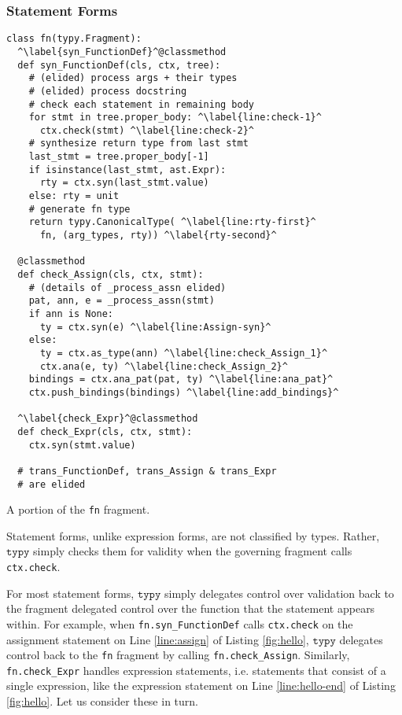 \documentclass[preprint,10pt]{sigplanconf}
\newcommand{\typy}{\texttt{typy}}
\newcommand{\lip}[1]{\lstinline[language=Python,basicstyle=\ttfamily\footnotesize,deletendkeywords={tuple,buffer,map}]{#1}}
\newcommand{\li}[1]{\lip{#1}}
\begin{document}
\subsubsection{Statement Forms}\label{sec:statements}
\begin{codelisting}
\vspace{-3px}
\begin{lstlisting}
class fn(typy.Fragment):
  ^\label{syn_FunctionDef}^@classmethod
  def syn_FunctionDef(cls, ctx, tree):
    # (elided) process args + their types
    # (elided) process docstring
    # check each statement in remaining body
    for stmt in tree.proper_body: ^\label{line:check-1}^
      ctx.check(stmt) ^\label{line:check-2}^
    # synthesize return type from last stmt
    last_stmt = tree.proper_body[-1]
    if isinstance(last_stmt, ast.Expr): 
      rty = ctx.syn(last_stmt.value)
    else: rty = unit
    # generate fn type
    return typy.CanonicalType( ^\label{line:rty-first}^
      fn, (arg_types, rty)) ^\label{rty-second}^

  @classmethod
  def check_Assign(cls, ctx, stmt):
    # (details of _process_assn elided)
    pat, ann, e = _process_assn(stmt)
    if ann is None: 
      ty = ctx.syn(e) ^\label{line:Assign-syn}^
    else:
      ty = ctx.as_type(ann) ^\label{line:check_Assign_1}^
      ctx.ana(e, ty) ^\label{line:check_Assign_2}^
    bindings = ctx.ana_pat(pat, ty) ^\label{line:ana_pat}^
    ctx.push_bindings(bindings) ^\label{line:add_bindings}^

  ^\label{check_Expr}^@classmethod
  def check_Expr(cls, ctx, stmt):
    ctx.syn(stmt.value)
    
  # trans_FunctionDef, trans_Assign & trans_Expr
  # are elided 
\end{lstlisting}
\caption{A portion of the \li{fn} fragment.}
\label{fig:fn}
\end{codelisting}
Statement forms, unlike expression forms, are not classified by types. Rather, $\typy$ simply checks them for validity when the governing fragment calls \li{ctx.check}. 

For most statement forms, $\typy$ simply delegates control over validation back to the fragment delegated control over the function that the statement appears within. For example, when \li{fn.syn_FunctionDef} calls \li{ctx.check} on the assignment statement on Line \ref{line:assign} of Listing \ref{fig:hello}, $\typy$ delegates control back to the \li{fn} fragment by calling \li{fn.check_Assign}. Similarly, \li{fn.check_Expr} handles expression statements, i.e. statements that consist of a single expression, like the expression statement on Line \ref{line:hello-end} of Listing \ref{fig:hello}. Let us consider these in turn.
\end{document}
